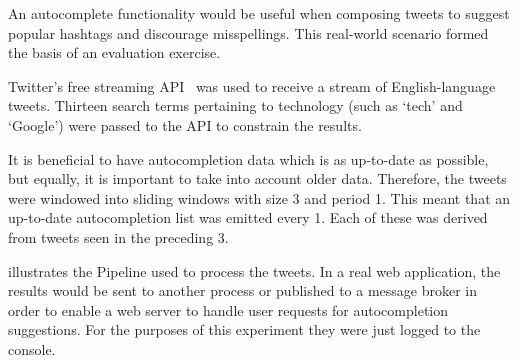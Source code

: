 An autocomplete functionality would be useful when composing tweets to suggest popular hashtags and discourage misspellings.
This real-world scenario formed the basis of an evaluation exercise.

Twitter's free streaming API~\cite{TwitterStreamingAPI} was used to receive a stream of English-language tweets.
Thirteen search terms pertaining to technology (such as `tech' and `Google') were passed to the API to constrain the results.

It is beneficial to have autocompletion data which is as up-to-date as possible, but equally, it is important to take into account older data.
Therefore, the tweets were windowed into sliding windows with size \SI{3}{\min} and period \SI{1}{\min}.
This meant that an up-to-date autocompletion list was emitted every \SI{1}{\min}.
Each of these was derived from tweets seen in the preceding \SI{3}{\min}.

 illustrates the Pipeline used to process the tweets.
In a real web application, the results would be sent to another process or published to a message broker in order to enable a web server to handle user requests for autocompletion suggestions.
For the purposes of this experiment they were just logged to the console.

